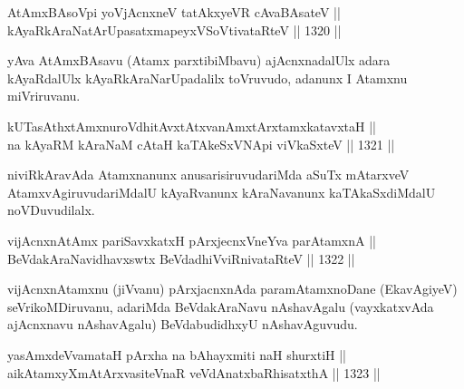 
\begin{shl}
AtAmxBAsoV\s pi yoV\s jAcnxneV tatAkxyeVR cAvaBAsateV || \\
kAyaRkAraNatArUpasatxmapeyxVSoV\s tivataRteV \hfill || 1320 ||  
\end{shl}

\begin{artha}
yAva AtAmxBAsavu (Atamx parxtibiMbavu) ajAcnxnadalUlx adara kAyaRdalUlx kAyaRkAraNarUpadalilx toVruvudo, adanunx I Atamxnu miVriruvanu.
\end{artha}

\begin{shl}
kUTasAthxtAmxnuroVdhitAvxtAtxvanAmxtArxtamxkatavxtaH || \\
na kAyaRM kAraNaM cAtaH kaTAkeSxVNApi viVkaSxteV \hfill || 1321 ||  
\end{shl}

\begin{artha}
niviRkAravAda Atamxnanunx anusarisiruvudariMda aSuTx mAtarxveV AtamxvAgiruvudariMdalU kAyaRvanunx kAraNavanunx kaTAkaSxdiMdalU noVDuvudilalx.
\end{artha}


\begin{shl}
vijAcnxnAtAmx pariSavxkatxH pArxjecnxVneYva parAtamxnA || \\
BeVdakAraNa\footnotemark[1]vidhavxswtx BeVdadhiVviRnivataRteV \hfill || 1322 ||  
\end{shl}

\begin{artha}
vijAcnxnAtamxnu (jiVvanu) pArxjacnxnAda paramAtamxnoDane (EkavAgiyeV) seVrikoMDiruvanu, adariMda BeVdakAraNavu nAshavAgalu (vayxkatxvAda ajAcnxnavu nAshavAgalu) BeVdabudidhxyU nAshavAguvudu.
\end{artha}

\begin{shl}
yasAmxdeVvamataH pArxha na bAhayxmiti naH shurxtiH || \\
aikAtamxyXmAtArxvasiteVnaR veVdAnatxbaRhisatxthA \hfill || 1323 ||  
\end{shl}

